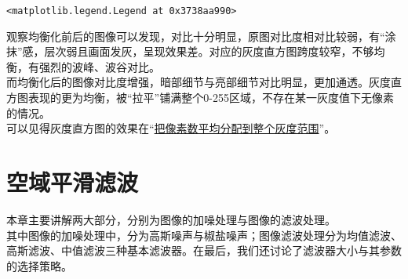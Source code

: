 \documentclass[11pt]{article}
\makeatletter
\newcommand{\boxspacing}{\kern\kvtcb@left@rule\kern\kvtcb@boxsep}
\newcommand{\prompt}[4]{
	{\ttfamily\llap{{\color{#2}[#3]:\hspace{3pt}#4}}\vspace{-\baselineskip}}
}
\makeatother
\begin{document}
            \begin{tcolorbox}[breakable, size=fbox, boxrule=.5pt, pad at break*=1mm, opacityfill=0]
\begin{Verbatim}[commandchars=\\\{\}]
<matplotlib.legend.Legend at 0x3738aa990>
\end{Verbatim}
\end{tcolorbox}
        
    \begin{center}
    \end{center}
    观察均衡化前后的图像可以发现，对比十分明显，原图对比度相对比较弱，有“涂抹”感，层次弱且画面发灰，呈现效果差。对应的灰度直方图跨度较窄，不够均衡，有强烈的波峰、波谷对比。\\
    而均衡化后的图像对比度增强，暗部细节与亮部细节对比明显，更加通透。灰度直方图表现的更为均衡，被“拉平”铺满整个0-255区域，不存在某一灰度值下无像素的情况。\\
    可以见得灰度直方图的效果在“\underline{把像素数平均分配到整个灰度范围}”。
    
    \section{空域平滑滤波}
   本章主要讲解两大部分，分别为图像的加噪处理与图像的滤波处理。\\
   其中图像的加噪处理中，分为高斯噪声与椒盐噪声；图像滤波处理分为均值滤波、高斯滤波、中值滤波三种基本滤波器。在最后，我们还讨论了滤波器大小与其参数的选择策略。
\end{document}
